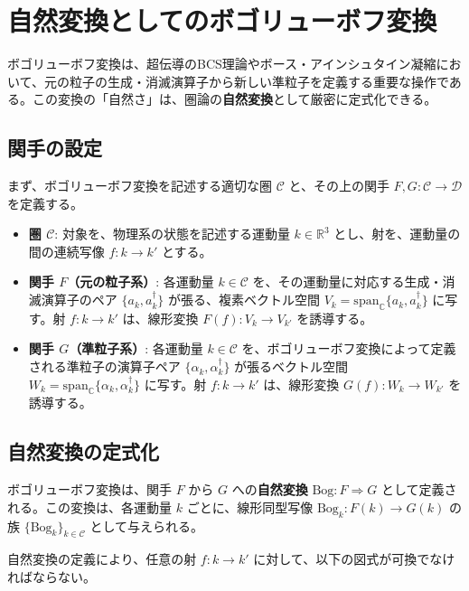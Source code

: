 \documentclass[uplatex,a4j,12pt,dvipdfmx]{jsarticle}
\begin{document}
\section{自然変換としてのボゴリューボフ変換}

ボゴリューボフ変換は、超伝導のBCS理論やボース・アインシュタイン凝縮において、元の粒子の生成・消滅演算子から新しい準粒子を定義する重要な操作である。この変換の「自然さ」は、圏論の\textbf{自然変換}として厳密に定式化できる。

\subsection{関手の設定}

まず、ボゴリューボフ変換を記述する適切な圏 $\mathcal{C}$ と、その上の関手 $F, G: \mathcal{C} \to \mathcal{D}$ を定義する。

\begin{itemize}
	\item \textbf{圏 $\mathcal{C}$}: 対象を、物理系の状態を記述する運動量 $k \in \mathbb{R}^3$ とし、射を、運動量の間の連続写像 $f: k \to k'$ とする。
	\item \textbf{関手 $F$（元の粒子系）}: 各運動量 $k \in \mathcal{C}$ を、その運動量に対応する生成・消滅演算子のペア $\{a_{k}, a_{k}^{\dagger}\}$ が張る、複素ベクトル空間 $V_{k} = \mathrm{span}_\mathbb{C}\{a_{k}, a_{k}^{\dagger}\}$ に写す。射 $f: k \to k'$ は、線形変換 $F(f): V_{k} \to V_{k'}$ を誘導する。
	\item \textbf{関手 $G$（準粒子系）}: 各運動量 $k \in \mathcal{C}$ を、ボゴリューボフ変換によって定義される準粒子の演算子ペア $\{\alpha_{k}, \alpha_{k}^{\dagger}\}$ が張るベクトル空間 $W_{k} = \mathrm{span}_\mathbb{C}\{\alpha_{k}, \alpha_{k}^{\dagger}\}$ に写す。射 $f: k \to k'$ は、線形変換 $G(f): W_{k} \to W_{k'}$ を誘導する。
\end{itemize}

\subsection{自然変換の定式化}

ボゴリューボフ変換は、関手 $F$ から $G$ への\textbf{自然変換} $\text{Bog}: F \Rightarrow G$ として定義される。この変換は、各運動量 $k$ ごとに、線形同型写像 $\text{Bog}_{k}: F(k) \to G(k)$ の族 $\{\text{Bog}_{k}\}_{k \in \mathcal{C}}$ として与えられる。

自然変換の定義により、任意の射 $f: k \to k'$ に対して、以下の図式が可換でなければならない。
\end{document}
